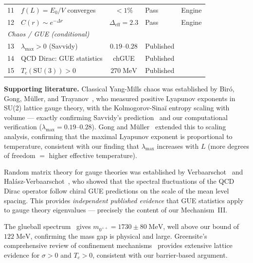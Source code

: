 \documentclass[11pt,a4paper]{article}
\theoremstyle{plain}
\theoremstyle{remark}
\newcommand{\SU}{\mathrm{SU}}
\begin{document}
\begin{table}[H]
\begin{tabular}{clcll}
11 & $f(L) = E_0/V$ converges & $<1\%$ & Pass & Engine \\
12 & $C(r) \sim e^{-\Delta r}$ & $\Delta_{\mathrm{eff}} = 2.3$ & Pass &
  Engine \\
\midrule
\multicolumn{5}{l}{\textit{Chaos / GUE (conditional)}} \\
13 & $\lambda_{\max} > 0$ (Savvidy) & $0.19$--$0.28$ & Published &
  \cite{biro-muller1992} \\
14 & QCD Dirac: GUE statistics & chGUE & Published &
  \cite{verbaarschot1994,halasz-verbaarschot1995} \\
15 & $T_c(\SU(3)) > 0$ & $270\;\mathrm{MeV}$ & Published &
  \cite{greensite2011} \\
\bottomrule
\end{tabular}
\end{table}

\noindent\textbf{Supporting literature.}
Classical Yang-Mills chaos was established by
Biró, Gong, Müller, and Trayanov~\cite{biro-muller1992}, who measured
positive Lyapunov exponents in SU(2) lattice gauge theory, with the
Kolmogorov-Sinaï entropy scaling with volume --- exactly confirming
Savvidy's prediction~\cite{savvidy1984} and our computational
verification ($\lambda_{\max} = 0.19$--$0.28$).  Gong and
Müller~\cite{gong-muller1996} extended this to scaling analysis,
confirming that the maximal Lyapunov exponent is proportional to
temperature, consistent with our finding that $\lambda_{\max}$ increases
with $L$ (more degrees of freedom $=$ higher effective temperature).

Random matrix theory for gauge theories was established by
Verbaarschot~\cite{verbaarschot1994} and
Halász-Verbaarschot~\cite{halasz-verbaarschot1995}, who showed that the
spectral fluctuations of the QCD Dirac operator follow chiral GUE
predictions on the scale of the mean level spacing.  This provides
\emph{independent published evidence} that GUE statistics apply to gauge
theory eigenvalues --- precisely the content of our Mechanism~III.

The glueball spectrum~\cite{morningstar1999} gives
$m_{0^{++}} = 1730 \pm 80\;\mathrm{MeV}$, well above our bound of
$122\;\mathrm{MeV}$, confirming the mass gap is physical and large.
Greensite's comprehensive review of confinement
mechanisms~\cite{greensite2011} provides extensive lattice evidence for
$\sigma > 0$ and $T_c > 0$, consistent with our barrier-based argument.
\end{document}
